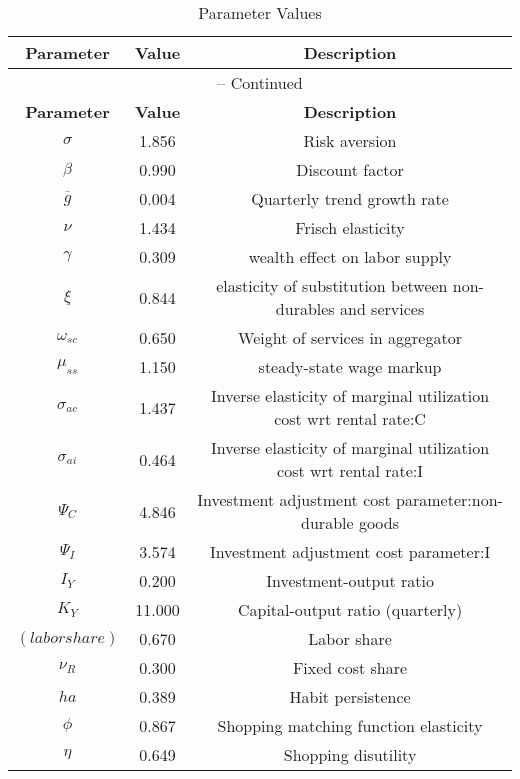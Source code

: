 \begin{center}
\begin{longtable}{ccc}
\caption{Parameter Values}\\%
\toprule%
\multicolumn{1}{c}{\textbf{Parameter}} &
\multicolumn{1}{c}{\textbf{Value}} &
 \multicolumn{1}{c}{\textbf{Description}}\\%
\midrule%
\endfirsthead
\multicolumn{3}{c}{{\tablename} \thetable{} -- Continued}\\%
\midrule%
\multicolumn{1}{c}{\textbf{Parameter}} &
\multicolumn{1}{c}{\textbf{Value}} &
  \multicolumn{1}{c}{\textbf{Description}}\\%
\midrule%
\endhead
${\sigma}$ 	 & 	 1.856 	 & 	 Risk aversion\\
${\beta}$ 	 & 	 0.990 	 & 	 Discount factor\\
${\overline{g}}$ 	 & 	 0.004 	 & 	 Quarterly trend growth rate\\
$\nu$ 	 & 	 1.434 	 & 	 Frisch elasticity\\
$\gamma$ 	 & 	 0.309 	 & 	 wealth effect on labor supply\\
$\xi$ 	 & 	 0.844 	 & 	 elasticity of substitution between non-durables and services\\
$\omega_{sc}$ 	 & 	 0.650 	 & 	 Weight of services in aggregator\\
$\mu_{ss}$ 	 & 	 1.150 	 & 	 steady-state wage markup\\
${\sigma_{ac}}$ 	 & 	 1.437 	 & 	 Inverse elasticity of marginal utilization cost wrt rental rate:C\\
${\sigma_{ai}}$ 	 & 	 0.464 	 & 	 Inverse elasticity of marginal utilization cost wrt rental rate:I\\
${\Psi_{C}}$ 	 & 	 4.846 	 & 	 Investment adjustment cost parameter:non-durable goods\\
${\Psi_I}$ 	 & 	 3.574 	 & 	 Investment adjustment cost parameter:I\\
${I_Y}$ 	 & 	 0.200 	 & 	 Investment-output ratio\\
${K_Y}$ 	 & 	 11.000 	 & 	 Capital-output ratio (quarterly)\\
$(labor share)$ 	 & 	 0.670 	 & 	 Labor share\\
${\nu_R}$ 	 & 	 0.300 	 & 	 Fixed cost share\\
${ha}$ 	 & 	 0.389 	 & 	 Habit persistence\\
${\phi}$ 	 & 	 0.867 	 & 	 Shopping matching function elasticity\\
${\eta}$ 	 & 	 0.649 	 & 	 Shopping disutility\\

\end{longtable}
\end{center}
